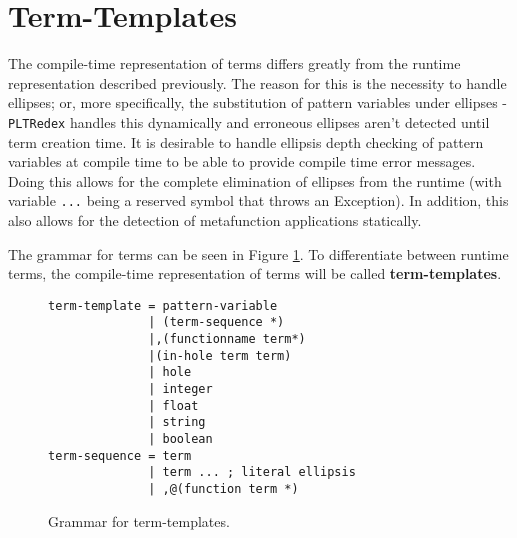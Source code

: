 \section{Term-Templates}
\label{section:term-templates}

The compile-time representation of terms differs greatly from the runtime representation described previously. The reason for this is the necessity to handle ellipses; or, more specifically, the substitution of pattern variables under ellipses - \texttt{PLTRedex} handles this dynamically and erroneous ellipses aren't detected until term creation time.
It is desirable to handle ellipsis depth checking of pattern variables at compile time to be able to provide compile time error messages. Doing this allows for the complete elimination of ellipses from the runtime (with variable \texttt{...} being a reserved symbol that throws an Exception). In addition, this also allows for the detection of metafunction applications statically.

The grammar for terms can be seen in Figure \ref{termtemplate-grammar}. To differentiate between runtime terms, the compile-time representation of terms will be called \textbf{term-templates}.

\begin{figure}
\begin{verbatim}
term-template = pattern-variable
              | (term-sequence *)
              |,(functionname term*)
              |(in-hole term term)
              | hole
              | integer
              | float
              | string
              | boolean
term-sequence = term
              | term ... ; literal ellipsis
              | ,@(function term *)
\end{verbatim}
\caption{Grammar for term-templates.}
\label{termtemplate-grammar}
\end{figure}

